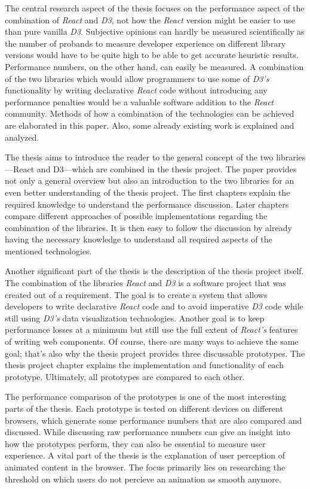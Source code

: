 The central research aspect of the thesis focuses on the performance aspect of the combination of \emph{React} and \emph{D3}, not how the \emph{React} version might be easier to use than pure vanilla \emph{D3}. Subjective opinions can hardly be measured scientifically as the number of probands to measure developer experience on different library versions would have to be quite high to be able to get accurate heuristic results. Performance numbers, on the other hand, can easily be measured. A combination of the two libraries which would allow programmers to use some of \emph{D3's} functionality by writing declarative \emph{React} code without introducing any performance penalties would be a valuable software addition to the \emph{React} community. Methods of how a combination of the technologies can be achieved are elaborated in this paper. Also, some already existing work is explained and analyzed.

The thesis aims to introduce the reader to the general concept of the two libraries---React and D3---which are combined in the thesis project. The paper provides not only a general overview but also an introduction to the two libraries for an even better understanding of the thesis project. The first chapters explain the required knowledge to understand the performance discussion. Later chapters compare different approaches of possible implementations regarding the combination of the libraries. It is then easy to follow the discussion by already having the necessary knowledge to understand all required aspects of the mentioned technologies.

Another significant part of the thesis is the description of the thesis project itself. The combination of the libraries \emph{React} and \emph{D3} is a software project that was created out of a requirement. The goal is to create a system that allows developers to write declarative \emph{React} code and to avoid imperative \emph{D3} code while still using \emph{D3's} data visualization technologies. Another goal is to keep performance losses at a minimum but still use the full extent of \emph{React's} features of writing web components. Of course, there are many ways to achieve the same goal; that's also why the thesis project provides three discussable prototypes. The thesis project chapter explains the implementation and functionality of each prototype. Ultimately, all prototypes are compared to each other.

The performance comparison of the prototypes is one of the most interesting parts of the thesis. Each prototype is tested on different devices on different browsers, which generate some performance numbers that are also compared and discussed. While discussing raw performance numbers can give an insight into how the prototypes perform, they can also be essential to measure user experience. A vital part of the thesis is the explanation of user perception of animated content in the browser. The focus primarily lies on researching the threshold on which users do not percieve an animation as smooth anymore.

